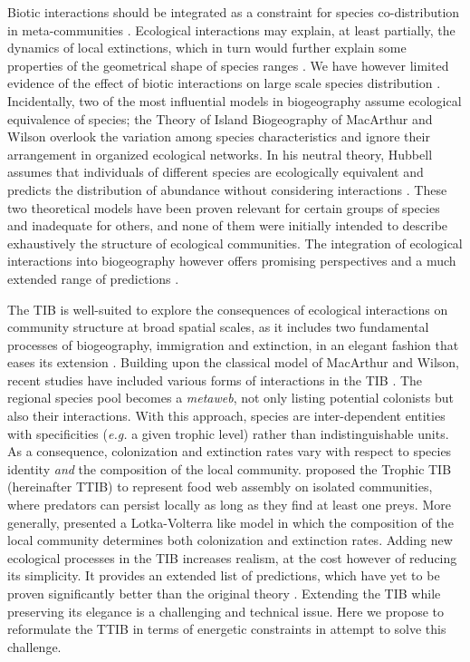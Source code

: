 Biotic interactions should be integrated as a constraint for species
co-distribution in meta-communities \citep{Jabot2012, Cazelles2016a}.
Ecological interactions may explain, at least partially, the dynamics of
local extinctions, which in turn would further explain some properties
of the geometrical shape of species ranges \citep[\emph{e.g.} nested
distributions of parasitoid and its host,][]{Shenbrot2007}. We have
however limited evidence of the effect of biotic interactions on large
scale species distribution \citep[see Chapter \ref{chap3} - but
see][]{Gotelli2010}. Incidentally, two of the most influential models in
biogeography assume ecological equivalence of species; the Theory of
Island Biogeography of MacArthur and Wilson \citep[hereafter
TIB,][]{MacArthur1967} overlook the variation among species
characteristics and ignore their arrangement in organized ecological
networks. In his neutral theory, Hubbell assumes that individuals of
different species are ecologically equivalent and predicts the
distribution of abundance without considering interactions
\citep{Hubbell1997, Hubbell2001}. These two theoretical models have been
proven relevant for certain groups of species and inadequate for others,
and none of them were initially intended to describe exhaustively the
structure of ecological communities. The integration of ecological
interactions into biogeography however offers promising perspectives and
a much extended range of predictions \citep{Holt2010, Gravel2011}.

The TIB is well-suited to explore the consequences of ecological
interactions on community structure at broad spatial scales, as it
includes two fundamental processes of biogeography, immigration and
extinction, in an elegant fashion that eases its extension
\citep{Losos2010, Warren2015}. Building upon the classical model of
MacArthur and Wilson, recent studies have included various forms of
interactions in the TIB \citep{Gravel2011, Cazelles2016a}. The regional
species pool becomes a \emph{metaweb}, not only listing potential
colonists but also their interactions. With this approach, species are
inter-dependent entities with specificities (\emph{e.g.} a given trophic
level) rather than indistinguishable units. As a consequence,
colonization and extinction rates vary with respect to species identity
\emph{and} the composition of the local community. \citet{Gravel2011}
proposed the Trophic TIB (hereinafter TTIB) to represent food web
assembly on isolated communities, where predators can persist locally as
long as they find at least one preys. More generally,
\citet{Cazelles2016a} presented a Lotka-Volterra like model in which the
composition of the local community determines both colonization and
extinction rates. Adding new ecological processes in the TIB increases
realism, at the cost however of reducing its simplicity. It provides an
extended list of predictions, which have yet to be proven significantly
better than the original theory \citep[see][]{Cirtwill2015}. Extending
the TIB while preserving its elegance is a challenging and technical
issue. Here we propose to reformulate the TTIB in terms of energetic
constraints in attempt to solve this challenge.

